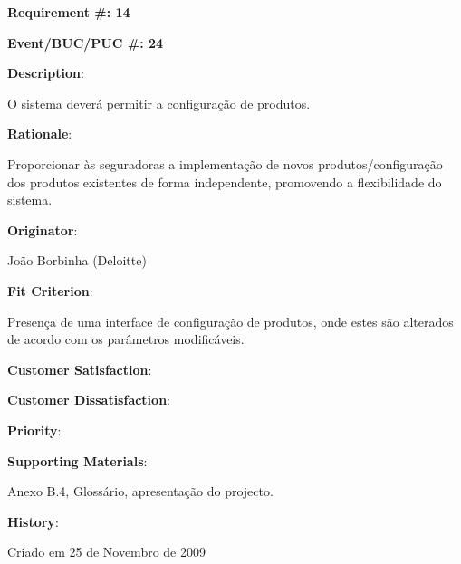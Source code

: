 \pagebreak

\begin{minipage}{0.55\textwidth}
\begin{flushleft}\textbf{Requirement \#: 14}\end{flushleft}
\end{minipage}
\begin{minipage}{0.4\textwidth}
\begin{flushright}\textbf{Event/BUC/PUC \#: 24}\end{flushright}
\end{minipage}

\begin{description}
\item \textbf{Description}:

O sistema deverá permitir a configuração de produtos.\\

\item \textbf{Rationale}:

Proporcionar às seguradoras a implementação de novos produtos/configuração dos produtos existentes de forma independente, promovendo a flexibilidade do sistema.\\

\item \textbf{Originator}:

João Borbinha (Deloitte)\\

\item \textbf{Fit Criterion}:

Presença de uma interface de configuração de produtos, onde estes são alterados de acordo com os parâmetros modificáveis.\\

\begin{minipage}{0.45\textwidth}
\begin{flushleft}\item \textbf{Customer Satisfaction}:\end{flushleft}
\end{minipage}
\begin{minipage}{0.45\textwidth}
\begin{flushleft}\item \textbf{Customer Dissatisfaction}:\end{flushleft}
\end{minipage}

\item \textbf{Priority}:\\

\item \textbf{Supporting Materials}:

Anexo B.4, Glossário, apresentação do projecto.\\

\item \textbf{History}:

Criado em 25 de Novembro de 2009\\
\end{description}

